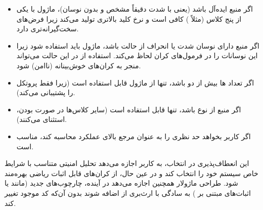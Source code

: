 \begin{itemize}
	\item اگر منبع ایده‌آل باشد (یعنی  با شدت دقیقاً مشخص و بدون نوسان)، ماژول  با یکی از پنج کلاس (مثلاً ) کافی است و نرخ کلید بالاتری تولید می‌کند زیرا فرض‌های سخت‌گیرانه‌تری دارد.
	\item اگر منبع دارای نوسان شدت یا انحراف از حالت  باشد، ماژول  باید استفاده شود زیرا این نوسانات را در فرمول‌های کران لحاظ می‌کند. استفاده از  در این حالت می‌تواند منجر به کران‌های خوش‌بینانه (ناامن) شود.
	\item اگر تعداد ‌ها بیش از دو باشد، تنها  از ماژول  قابل استفاده است (زیرا  فقط پروتکل  را پشتیبانی می‌کند).
	\item اگر منبع از نوع  باشد، تنها  قابل استفاده است (سایر کلاس‌ها در صورت  بودن، استثنای   می‌کنند).
	\item اگر کاربر بخواهد حد نظری  را به عنوان مرجع بالای عملکرد محاسبه کند،  مناسب است.
\end{itemize}

این انعطاف‌پذیری در انتخاب، به کاربر اجازه می‌دهد تحلیل امنیتی متناسب با شرایط خاص سیستم خود را انتخاب کند و در عین حال، از کران‌های قابل اثبات ریاضی بهره‌مند شود. طراحی ماژولار همچنین اجازه می‌دهد در آینده، چارچوب‌های جدید (مانند  یا اثبات‌های مبتنی بر ) به سادگی با ارث‌بری از  اضافه شوند بدون آن‌که کد موجود تغییر کند.
